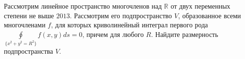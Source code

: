 \documentclass{article}
\begin{document}
Рассмотрим линейное пространство многочленов над $\mathbb{R}$ от двух переменных степени не выше $2013$. 
Рассмотрим его подпространство $V$, образованное всеми многочленами $f$, для которых криволинейный интеграл первого рода $\oint\limits_{\{x^2+y^2=R^2\}} f(x,y) ds = 0$, причем для любого $R$. Найдите размерность подпространства $V$.
\end{document}

